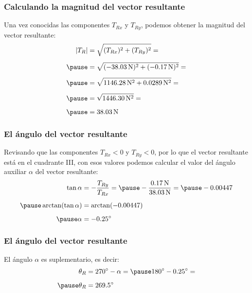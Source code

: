 \documentclass[12pt]{beamer}
\begin{document}
\begin{frame}
\frametitle{Calculando la magnitud del vector resultante}
Una vez conocidas las componentes $T_{Rx}$ y $T_{Ry}$, podemos obtener la magnitud del vector resultante:
\pause
\begin{eqnarray*}
\begin{aligned}
\abs{T_{R}} &= \sqrt{(T_{Rx})^{2} + (T_{Ry})^{2}} = \\[0.5em] \pause
&= \sqrt{ (- \SI{38.03}{\newton})^{2} + (-\SI{0.17}{\newton})^{2}} = \\[0.5em] \pause
&= \sqrt{ \SI{1146.28}{\square\newton} + \SI{0.0289}{\square\newton}} = \\[0.5em] \pause
&= \sqrt{\SI{1446.30}{\square\newton}} = \\[0.5em] \pause
&= \SI{38.03}{\newton}
\end{aligned}
\end{eqnarray*}
\end{frame}
\begin{frame}
\frametitle{El ángulo del vector resultante}
Revisando que las componentes $T_{Rx} < 0$ y $T_{Ry} < 0$, por lo que el vector resultante está en el cuadrante III, \pause con esos valores podemos calcular el valor del ángulo auxiliar $\alpha$ del vector resultante:
\pause
\begin{eqnarray*}
\begin{aligned}
\tan \alpha &= - \dfrac{T_{Ry}}{T_{Rx}} = \pause
 - \dfrac{\SI{0.17}{\newton}}{\SI{38.03}{\newton}} = \pause - 0.00447 \\[0.5em] \pause
\arctan(\tan \alpha) &= \arctan(- 0.00447) \\[0.5em] \pause
\alpha &= - \ang{0.25}
\end{aligned}
\end{eqnarray*}
\end{frame}
\begin{frame}
\frametitle{El ángulo del vector resultante}
El ángulo $\alpha$ es suplementario, es decir:
\pause
\begin{eqnarray*}
\begin{aligned}
\theta_{R} &= \ang{270} - \alpha = \pause \ang{180} - \ang{0.25} = \\[0.5em] \pause
\theta_{R} &= \ang{269.5}
\end{aligned}
\end{eqnarray*}
\end{frame}
\end{document}
